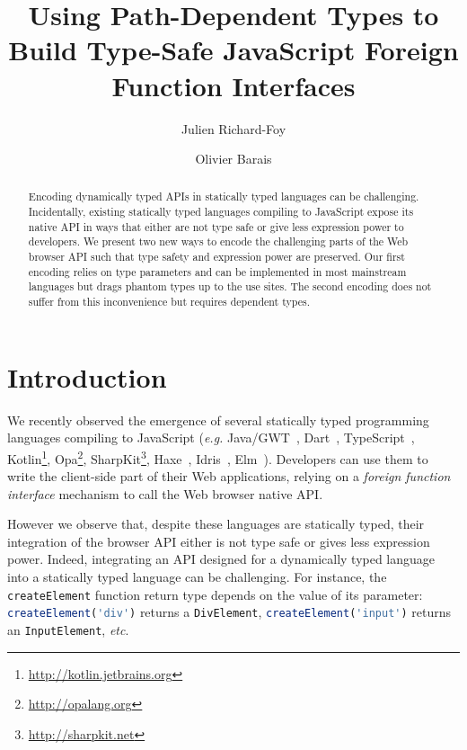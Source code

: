\documentclass{llncs}
\newcommand{\jscode}[1]{\lstinline[language=JavaScript]|#1|}
\begin{document}
 \title{Using Path-Dependent Types to Build Type-Safe JavaScript Foreign Function Interfaces}

 \author{Julien Richard-Foy \and Olivier Barais}



 \maketitle

\begin{abstract}
Encoding dynamically typed APIs in statically typed languages can be challenging. Incidentally, existing statically typed languages compiling to JavaScript expose its native API in ways that either are not type safe or give less expression power to developers. We present two new ways to encode the challenging parts of the Web browser API such that type safety and expression power are preserved. Our first encoding relies on type parameters and can be implemented in most mainstream languages but drags phantom types up to the use sites. The second encoding does not suffer from this inconvenience but requires dependent types.
\end{abstract}

\section{Introduction}

We recently observed the emergence of several statically typed programming languages compiling to JavaScript (\emph{e.g.} Java/GWT~\cite{Kereki09_GWT}, Dart~\cite{Griffith11_Dart}, TypeScript~\cite{fenton2012typescript}, Kotlin\footnote{\href{http://kotlin.jetbrains.org}{http://kotlin.jetbrains.org}}, Opa\footnote{\href{http://opalang.org}{http://opalang.org}}, SharpKit\footnote{\href{http://sharpkit.net}{http://sharpkit.net}}, Haxe~\cite{Cannasse08_HaXe}, Idris~\cite{Brady13_Idris}, Elm~\cite{czaplicki2012elm}). Developers can use them to write the client-side part of their Web applications, relying on a \emph{foreign function interface} mechanism to call the Web browser native API.

However we observe that, despite these languages are statically typed, their integration of the browser API either is not type safe or gives less expression power. Indeed, integrating an API designed for a dynamically typed language into a statically typed language can be challenging. For instance, the \jscode{createElement} function return type depends on the value of its parameter: \jscode{createElement('div')} returns a \jscode{DivElement}, \jscode{createElement('input')} returns an \jscode{InputElement}, \emph{etc}.
\end{document}
